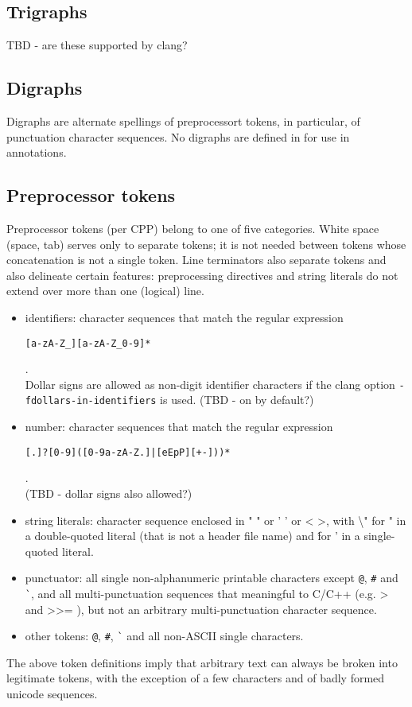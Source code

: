\subsection{Trigraphs}

TBD - are these supported by clang?

\subsection{Digraphs}
Digraphs are alternate spellings of preprocessort tokens, in particular, of
punctuation character sequences. No digraphs are defined in \acslpp for use
in \acslpp annotations.

\subsection{Preprocessor tokens}
Preprocessor tokens (per CPP) belong to one of five categories. White space (space, tab) serves only to separate tokens; it is not needed between tokens whose concatenation is not a single token. Line terminators also separate tokens and also delineate certain features: preprocessing directives and string literals do not extend over more than one (logical) line.
\begin{itemize}
	\item identifiers: character sequences that match the regular expression \\
\centerline{\texttt{[a-zA-Z\_][a-zA-Z\_0-9]*}} .\\ Dollar signs are allowed as non-digit identifier characters if the clang option \texttt{-fdollars-in-identifiers} is used. (TBD - on by default?)
	\item number: character sequences that match the regular expression  \\
\centerline{\texttt{[.]?[0-9]([0-9a-zA-Z.]|[eEpP][+-]))*}} . \\
(TBD - dollar signs also allowed?)
	\item string literals: character sequence enclosed in " " or ' ' or < >, with \textbackslash " for " in a double-quoted literal (that is not a header file name) and \' for ' in a single-quoted literal.
	\item punctuator: all single non-alphanumeric printable characters except 
\verb|@|, \verb|#| and \verb|`|, and all multi-punctuation sequences that meaningful to C/C++ (e.g. > and >{>}= ), but not an arbitrary multi-punctuation character sequence.
	\item other tokens: \verb|@|, \verb|#|, \verb|`| and all non-ASCII single characters.
\end{itemize}
The above token definitions imply that arbitrary text can always be broken into
legitimate tokens, with the exception of a few characters and of badly formed unicode sequences.


